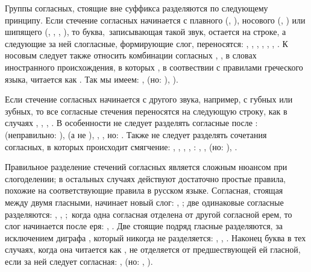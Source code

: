 \documentclass[12pt,a4paper,oneside]{extarticle}
\begin{document}
Группы согласных, стоящие вне суффикса разделяются по следующему принципу. Если стечение согласных начинается с плавного (, ), носового (, ) или шипящего (, , , ), то буква, записывающая такой звук, остается на строке, а следующие за ней слогласные, формирующие слог, переносятся: , , , , , , . К носовым следует также относить комбинации согласных , ,  в словах иностранного происхождения, в которых , в соотвествии с правилами греческого языка, читается как . Так мы имеем: ,  (но: ), ).

Если стечение согласных начинается с другого звука, например, с губных или зубных, то все согласные стечения переносятся на следующую строку, как в случаях , , , . В особенности не следует разделять согласные после :  (неправильно: ),  (а не ), , , но: . Также не следует разделять сочетания согласных, в которых происходит смягчение: , , , , : , ,  (но: ), .

Правильное разделение стечений согласных является сложным нюансом при слогоделении; в остальных случаях действуют достаточно простые правила, похожие на соответствующие правила в русском языке. Согласная, стоящая между двумя гласными, начинает новый слог: , ; две одинаковые согласные разделяются: , , ; когда одна согласная отделена от другой согласной ерем, то слог начинается после еря: , . Две стоящие подряд гласные разделяются, за исключением диграфа , который никогда не разделяется: , , . Наконец буква  в тех случаях, когда она читается как , не отделяется от предшествующей ей гласной, если за ней следует согласная: ,  (но: , ).
\end{document}
